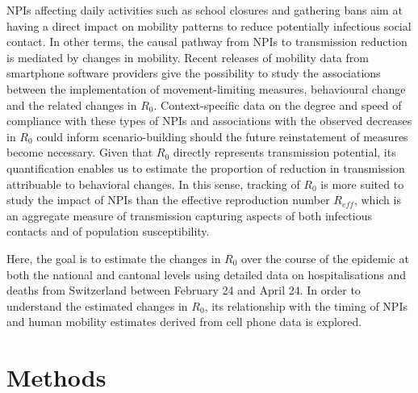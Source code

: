 NPIs affecting daily activities such as school closures and gathering bans aim at having a direct impact on mobility patterns to reduce potentially infectious social contact. In other terms, the causal pathway from NPIs to transmission reduction is mediated by changes in mobility. Recent releases of mobility data from smartphone software providers give the possibility to study the associations between the implementation of movement-limiting measures, behavioural change and the related changes in $R_0$. Context-specific data on the degree and speed of compliance with these types of NPIs and associations with the observed decreases in $R_0$ could inform scenario-building should the future reinstatement of measures become necessary. Given that $R_0$ directly represents transmission potential, its quantification enables us to estimate the proportion of reduction in transmission attribuable to behavioral changes. In this sense, tracking of $R_0$ is more suited to study the impact of NPIs than the effective reproduction number $R_{eff}$, which is an aggregate measure of transmission capturing aspects of both infectious contacts and of population susceptibility. 

Here, the goal is to estimate the changes in $R_0$ over the course of the epidemic at both the national and cantonal levels using detailed data on hospitalisations and deaths from Switzerland between February 24 and April 24. In order to understand the estimated changes in $R_0$, its relationship with the timing of NPIs and human mobility estimates derived from cell phone data is explored.

\section{Methods}
